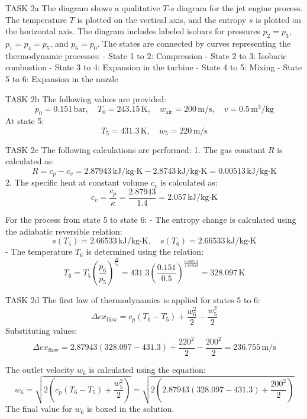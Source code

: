 TASK 2a  
The diagram shows a qualitative \( T \)-\( s \) diagram for the jet engine process. The temperature \( T \) is plotted on the vertical axis, and the entropy \( s \) is plotted on the horizontal axis. The diagram includes labeled isobars for pressures \( p_2 = p_3 \), \( p_1 = p_4 = p_5 \), and \( p_6 = p_0 \). The states are connected by curves representing the thermodynamic processes:  
- State 1 to 2: Compression  
- State 2 to 3: Isobaric combustion  
- State 3 to 4: Expansion in the turbine  
- State 4 to 5: Mixing  
- State 5 to 6: Expansion in the nozzle  

TASK 2b  
The following values are provided:  
\[
p_0 = 0.151 \, \text{bar}, \quad T_0 = 243.15 \, \text{K}, \quad w_{\text{air}} = 200 \, \text{m/s}, \quad v = 0.5 \, \text{m}^3/\text{kg}
\]  
At state 5:  
\[
T_5 = 431.3 \, \text{K}, \quad w_5 = 220 \, \text{m/s}
\]  

TASK 2c  
The following calculations are performed:  
1. The gas constant \( R \) is calculated as:  
\[
R = c_p - c_v = 2.87943 \, \text{kJ/kg·K} - 2.8743 \, \text{kJ/kg·K} = 0.00513 \, \text{kJ/kg·K}
\]  
2. The specific heat at constant volume \( c_v \) is calculated as:  
\[
c_v = \frac{c_p}{\kappa} = \frac{2.87943}{1.4} = 2.057 \, \text{kJ/kg·K}
\]  

For the process from state 5 to state 6:  
- The entropy change is calculated using the adiabatic reversible relation:  
\[
s(T_5) = 2.66533 \, \text{kJ/kg·K}, \quad s(T_6) = 2.66533 \, \text{kJ/kg·K}
\]  
- The temperature \( T_6 \) is determined using the relation:  
\[
T_6 = T_5 \left( \frac{p_6}{p_5} \right)^{\frac{R}{c_p}} = 431.3 \left( \frac{0.151}{0.5} \right)^{\frac{0.00513}{2.87943}} = 328.097 \, \text{K}
\]  

TASK 2d  
The first law of thermodynamics is applied for states 5 to 6:  
\[
\Delta ex_{\text{flow}} = c_p (T_6 - T_5) + \frac{w_6^2}{2} - \frac{w_5^2}{2}
\]  
Substituting values:  
\[
\Delta ex_{\text{flow}} = 2.87943 (328.097 - 431.3) + \frac{220^2}{2} - \frac{200^2}{2} = 236.755 \, \text{m/s}
\]  

The outlet velocity \( w_6 \) is calculated using the equation:  
\[
w_6 = \sqrt{2 \left( c_p (T_6 - T_5) + \frac{w_5^2}{2} \right)} = \sqrt{2 \left( 2.87943 (328.097 - 431.3) + \frac{200^2}{2} \right)}
\]  
The final value for \( w_6 \) is boxed in the solution.